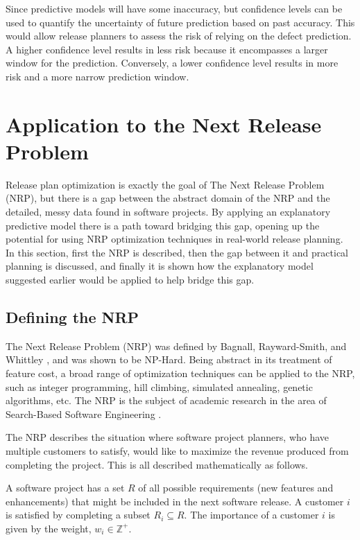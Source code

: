 \documentclass[letterpaper]{report}
\begin{document}
Since predictive models will have some inaccuracy, but confidence levels can be used to quantify the uncertainty of future prediction based on past accuracy. This would allow release planners to assess the risk of relying on the defect prediction. A higher confidence level results in less risk because it encompasses a larger window for the prediction. Conversely, a lower confidence level results in more risk and a more narrow prediction window.

\section*{Application to the Next Release Problem}
Release plan optimization is exactly the goal of The Next Release Problem (NRP), but there is a gap between the abstract domain of the NRP and the detailed, messy data found in software projects. By applying an explanatory predictive model there is a path toward bridging this gap, opening up the potential for using NRP optimization techniques in real-world release planning. In this section, first the NRP is described, then the gap between it and practical planning is discussed, and finally it is shown how the explanatory model suggested earlier would be applied to help bridge this gap.

\subsection*{Defining the NRP}
The Next Release Problem (NRP) was defined by Bagnall, Rayward-Smith, and Whittley \cite{2001_bagnall_nrp}, and was shown to be NP-Hard. Being abstract in its treatment of feature cost, a broad range of optimization techniques can be applied to the NRP, such as integer programming, hill climbing, simulated annealing, genetic algorithms, etc. The NRP is the subject of academic research in the area of Search-Based Software Engineering \cite{2010_jiang_hybrid,2012_xuan_solving,2007_zhang_multi_obj_nrp}.

The NRP describes the situation where software project planners, who have multiple customers to satisfy, would like to maximize the revenue produced from completing the project. This is all described mathematically as follows.

A software project has a set $R$ of all possible requirements (new features and enhancements) that might be included in the next software release. A customer $i$ is satisfied by completing a subset $R_i \subseteq R$. The importance of a customer $i$ is given by the weight, $w_i \in \mathbb{Z}^+$.
\end{document}
